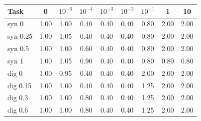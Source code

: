 \begin{tabular}{lcccccccc}\hline
Task & 0 & $10^{-6}$ & $10^{-4}$ & $10^{-3}$ & $10^{-2}$ & $10^{-1}$ & 1 & 10 \\ \hline
syn 0 & 1.00 & 1.00 & 0.40 & 0.40 & 0.40 & 0.80 & 2.00 & 2.00 \\
syn 0.25 & 1.00 & 1.05 & 0.40 & 0.40 & 0.40 & 0.80 & 2.00 & 2.00 \\
syn 0.5 & 1.00 & 1.00 & 0.60 & 0.40 & 0.40 & 0.80 & 2.00 & 2.00 \\
syn 1 & 1.00 & 1.05 & 0.90 & 0.40 & 0.40 & 0.80 & 0.80 & 0.80 \\
dig 0 & 1.00 & 0.95 & 0.40 & 0.40 & 0.40 & 2.00 & 2.00 & 2.00 \\
dig 0.15 & 1.00 & 1.00 & 0.40 & 0.40 & 0.40 & 1.25 & 2.00 & 2.00 \\
dig 0.3 & 1.00 & 1.00 & 0.80 & 0.40 & 0.40 & 1.25 & 2.00 & 2.00 \\
dig 0.6 & 1.00 & 1.00 & 0.80 & 0.40 & 0.40 & 1.25 & 2.00 & 2.00 \\
\hline\end{tabular}
